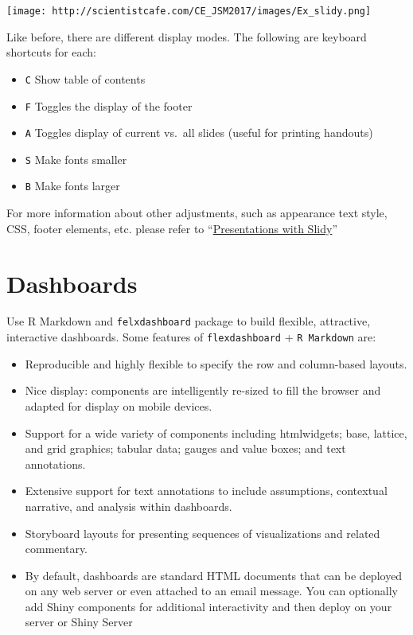 \documentclass[]{book}
\providecommand{\tightlist}{%
  \setlength{\itemsep}{0pt}\setlength{\parskip}{0pt}}
\theoremstyle{definition}
\theoremstyle{definition}
\theoremstyle{remark}
\begin{document}
\texttt{[image: http://scientistcafe.com/CE\_JSM2017/images/Ex\_slidy.png]}

Like before, there are different display modes. The following are
keyboard shortcuts for each:

\begin{itemize}
\tightlist
\item
  \texttt{C} Show table of contents
\item
  \texttt{F} Toggles the display of the footer
\item
  \texttt{A} Toggles display of current vs.~all slides (useful for
  printing handouts)
\item
  \texttt{S} Make fonts smaller
\item
  \texttt{B} Make fonts larger
\end{itemize}

For more information about other adjustments, such as appearance text
style, CSS, footer elements, etc. please refer to
``\href{http://rmarkdown.rstudio.com/slidy_presentation_format.html\#display_modes}{Presentations
with Slidy}''

\section{Dashboards}\label{dashboards}

Use R Markdown and \texttt{felxdashboard} package to build flexible,
attractive, interactive dashboards. Some features of
\texttt{flexdashboard} + \texttt{R\ Markdown} are:

\begin{itemize}
\item
  Reproducible and highly flexible to specify the row and column-based
  layouts.
\item
  Nice display: components are intelligently re-sized to fill the
  browser and adapted for display on mobile devices.
\item
  Support for a wide variety of components including htmlwidgets; base,
  lattice, and grid graphics; tabular data; gauges and value boxes; and
  text annotations.
\item
  Extensive support for text annotations to include assumptions,
  contextual narrative, and analysis within dashboards.
\item
  Storyboard layouts for presenting sequences of visualizations and
  related commentary.
\item
  By default, dashboards are standard HTML documents that can be
  deployed on any web server or even attached to an email message. You
  can optionally add Shiny components for additional interactivity and
  then deploy on your server or Shiny Server
\end{itemize}
\end{document}
